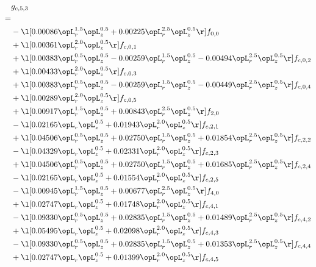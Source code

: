 \begin{alignat}{2} 
\label{eq:g_53_0} 
& g_{c,5,3} \nonumber \\ 
 = \\ 
& - \l[  0.00086 \opL_r^{1.5} \opL_z^{0.5} +  0.00225 \opL_r^{2.5} \opL_z^{0.5}  \r] f_{0,0} \nonumber \\ 
& + \l[  0.00361 \opL_r^{2.0} \opL_z^{0.5}  \r] f_{c,0,1} \nonumber \\ 
& + \l[  0.00383 \opL_r^{0.5} \opL_z^{0.5}   -0.00259 \opL_r^{1.5} \opL_z^{0.5}   -0.00494 \opL_r^{2.5} \opL_z^{0.5}  \r] f_{c,0,2} \nonumber \\ 
& + \l[  0.00433 \opL_r^{2.0} \opL_z^{0.5}  \r] f_{c,0,3} \nonumber \\ 
& + \l[  0.00383 \opL_r^{0.5} \opL_z^{0.5}   -0.00259 \opL_r^{1.5} \opL_z^{0.5}   -0.00449 \opL_r^{2.5} \opL_z^{0.5}  \r] f_{c,0,4} \nonumber \\ 
& + \l[  0.00289 \opL_r^{2.0} \opL_z^{0.5}  \r] f_{c,0,5} \nonumber \\ 
& + \l[  0.00917 \opL_r^{1.5} \opL_z^{0.5} +  0.00843 \opL_r^{2.5} \opL_z^{0.5}  \r] f_{2,0} \nonumber \\ 
& - \l[  0.02165 \opL_r \opL_z^{0.5} +  0.01943 \opL_r^{2.0} \opL_z^{0.5}  \r] f_{c,2,1} \nonumber \\ 
& + \l[  0.04506 \opL_r^{0.5} \opL_z^{0.5} +  0.02750 \opL_r^{1.5} \opL_z^{0.5} +  0.01854 \opL_r^{2.5} \opL_z^{0.5}  \r] f_{c,2,2} \nonumber \\ 
& - \l[  0.04329 \opL_r \opL_z^{0.5} +  0.02331 \opL_r^{2.0} \opL_z^{0.5}  \r] f_{c,2,3} \nonumber \\ 
& + \l[  0.04506 \opL_r^{0.5} \opL_z^{0.5} +  0.02750 \opL_r^{1.5} \opL_z^{0.5} +  0.01685 \opL_r^{2.5} \opL_z^{0.5}  \r] f_{c,2,4} \nonumber \\ 
& - \l[  0.02165 \opL_r \opL_z^{0.5} +  0.01554 \opL_r^{2.0} \opL_z^{0.5}  \r] f_{c,2,5} \nonumber \\ 
& - \l[  0.00945 \opL_r^{1.5} \opL_z^{0.5} +  0.00677 \opL_r^{2.5} \opL_z^{0.5}  \r] f_{4,0} \nonumber \\ 
& + \l[  0.02747 \opL_r \opL_z^{0.5} +  0.01748 \opL_r^{2.0} \opL_z^{0.5}  \r] f_{c,4,1} \nonumber \\ 
& - \l[  0.09330 \opL_r^{0.5} \opL_z^{0.5} +  0.02835 \opL_r^{1.5} \opL_z^{0.5} +  0.01489 \opL_r^{2.5} \opL_z^{0.5}  \r] f_{c,4,2} \nonumber \\ 
& + \l[  0.05495 \opL_r \opL_z^{0.5} +  0.02098 \opL_r^{2.0} \opL_z^{0.5}  \r] f_{c,4,3} \nonumber \\ 
& - \l[  0.09330 \opL_r^{0.5} \opL_z^{0.5} +  0.02835 \opL_r^{1.5} \opL_z^{0.5} +  0.01353 \opL_r^{2.5} \opL_z^{0.5}  \r] f_{c,4,4} \nonumber \\ 
& + \l[  0.02747 \opL_r \opL_z^{0.5} +  0.01399 \opL_r^{2.0} \opL_z^{0.5}  \r] f_{c,4,5} \nonumber \\ 
\end{alignat} 


